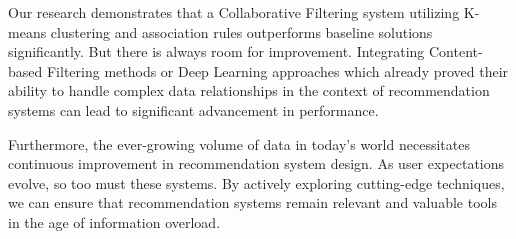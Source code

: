 Our research demonstrates that a Collaborative Filtering system utilizing K-means clustering and association rules outperforms baseline solutions significantly. But there is always room for improvement. Integrating Content-based Filtering methods or Deep Learning approaches which already proved their ability to handle complex data relationships in the context of recommendation systems can lead to significant advancement in performance.

Furthermore, the ever-growing volume of data in today's world necessitates continuous improvement in recommendation system design. As user expectations evolve, so too must these systems. By actively exploring cutting-edge techniques, we can ensure that recommendation systems remain relevant and valuable tools in the age of information overload.